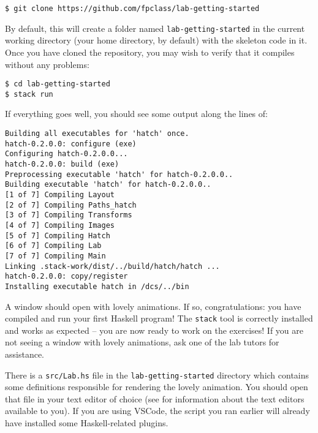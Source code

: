 \begin{verbatim}
$ git clone https://github.com/fpclass/lab-getting-started
\end{verbatim}
By default, this will create a folder named \texttt{\small lab-getting-started} in the current working directory (your home directory, by default) with the skeleton code in it. Once you have cloned the repository, you may wish to verify that it compiles without any problems:
\begin{verbatim}
$ cd lab-getting-started
$ stack run
\end{verbatim}
If everything goes well, you should see some output along the lines of:
\begin{verbatim}
Building all executables for 'hatch' once. 
hatch-0.2.0.0: configure (exe)
Configuring hatch-0.2.0.0...
hatch-0.2.0.0: build (exe)
Preprocessing executable 'hatch' for hatch-0.2.0.0..
Building executable 'hatch' for hatch-0.2.0.0..
[1 of 7] Compiling Layout           
[2 of 7] Compiling Paths_hatch 
[3 of 7] Compiling Transforms   
[4 of 7] Compiling Images   
[5 of 7] Compiling Hatch   
[6 of 7] Compiling Lab     
[7 of 7] Compiling Main  
Linking .stack-work/dist/../build/hatch/hatch ...
hatch-0.2.0.0: copy/register
Installing executable hatch in /dcs/../bin
\end{verbatim}
A window should open with lovely animations. If so, congratulations: you have compiled and run your first Haskell program! The \texttt{\small stack} tool is correctly installed and works as expected -- you are now ready to work on the exercises! If you are not seeing a window with lovely animations, ask one of the lab tutors for assistance.

\taskLine 

There is a \texttt{\small src/Lab.hs} file in the \texttt{\small lab-getting-started} directory which contains some definitions responsible for rendering the lovely animation. You should open that file in your text editor of choice (see  for information about the text editors available to you). If you are using VSCode, the  script you ran earlier will already have installed some Haskell-related plugins.


